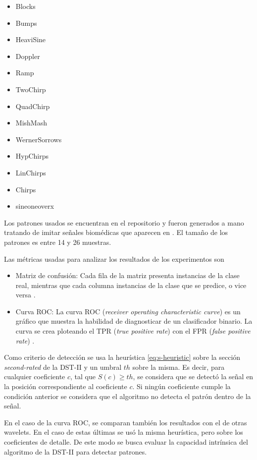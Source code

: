 \begin{itemize}
	\item  Blocks
	\item  Bumps
	\item  HeaviSine
	\item  Doppler
	\item  Ramp
	\item  TwoChirp
	\item  QuadChirp
	\item  MishMash
	\item  WernerSorrows
	\item  HypChirps
	\item  LinChirps
	\item  Chirps
	\item  sineoneoverx
\end{itemize}

Los patrones usados se encuentran en el repositorio y fueron generados a mano tratando de imitar señales biomédicas que
aparecen en \cite{Guido2018}. El tamaño de los patrones es entre 14 y 26 muestras.

Las métricas usadas para analizar los resultados de los experimentos son

\begin{itemize}
	\item Matriz de confusión: Cada fila de la matriz presenta instancias de la clase real, mientras que cada columna instancias
		de la clase que se predice, o vice versa \cite{wikipedia_2022_confusion_matrix}.
	\item Curva ROC: La curva ROC (\textit{receiver operating characteristic curve}) es un gráfico que muestra la habilidad de diagnosticar
		de un clasificador binario. La curva se crea ploteando el TPR (\textit{true positive rate}) con el FPR (\textit{false positive rate})
		\cite{wikipedia_2022_roc}.
\end{itemize}

Como criterio de detección se usa la heurística \ref{eq:s-heuristic} sobre la sección \textit{second-rated} de la
DST-II y un umbral $th$ sobre la misma. Es decir, para cualquier coeficiente $c$, tal que $S(c)\geq th$, se considera
que se detectó la señal en la posición correspondiente al coeficiente $c$. Si ningún coeficiente cumple la condición
anterior se considera que el algoritmo no detecta el patrón dentro de la señal. 

En el caso de la curva ROC, se comparan también los resultados con el de otras wavelets. En el caso de estas
últimas se usó la misma heurística, pero sobre los coeficientes de detalle. De este modo se busca evaluar 
la capacidad intrínsica del algoritmo de la DST-II para detectar patrones.

